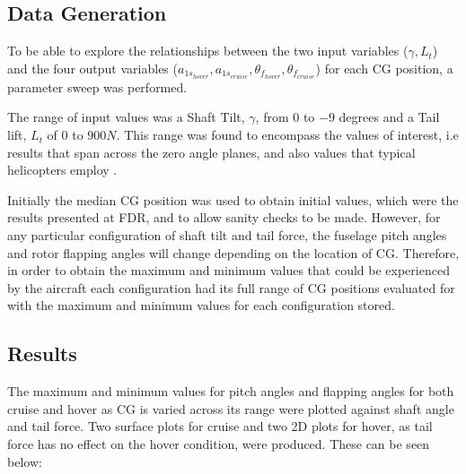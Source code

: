 \documentclass[11pt,a4paper]{article}
\begin{document}
\subsection{Data Generation}
To be able to explore the relationships between the two input variables ($\gamma,L_t$) and the  four output variables ($a_{1s_{hover}},a_{1s_{cruise}},\theta_{f_{hover}},\theta_{f_{cruise}}$) for each CG position, a parameter sweep was performed.

The range of input values was a Shaft Tilt, $\gamma$, from $0$ to $-9$ degrees and a Tail lift, $L_t$ of $0$ to $900N$. This range was found to encompass the values of interest, i.e results that span across the zero angle planes, and also values that typical helicopters employ \cite{prouty}.

Initially the median CG position was used to obtain initial values, which were the results presented at FDR, and to allow sanity checks to be made. However, for any particular configuration of shaft tilt and tail force, the fuselage pitch angles and rotor flapping angles will change depending on the location of CG. Therefore, in order to obtain the maximum and minimum values that could be experienced by the aircraft each configuration had its full range of CG positions evaluated for with the maximum and minimum values for each configuration stored.

\subsection{Results}

The maximum and minimum values for pitch angles and flapping angles for both cruise and hover as CG is varied across its range were plotted against shaft angle and tail force. Two surface plots for cruise and two 2D plots for hover, as tail force has no effect on the hover condition, were produced. These can be seen below:
\end{document}
